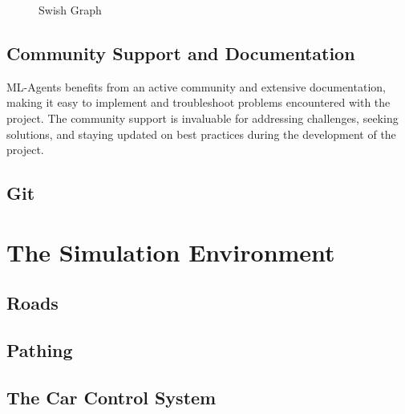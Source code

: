 \documentclass{article}
\begin{document}
\begin{figure}[h]
    \centering
    \caption{Swish Graph}
\end{figure}


\subsection{Community Support and Documentation}
ML-Agents benefits from an active community and extensive documentation, making it easy to implement and troubleshoot problems encountered with the project. The community support is invaluable for addressing challenges, seeking solutions, and staying updated on best practices during the development of the project.

\subsection{Git}
\lipsum[2][1]


\section{The Simulation Environment}
\lipsum[2][1]

\subsection{Roads}
\lipsum[2][1]

\subsection{Pathing}
\lipsum[2][1]

\subsection{The Car Control System}
\lipsum[2][1]
\end{document}
